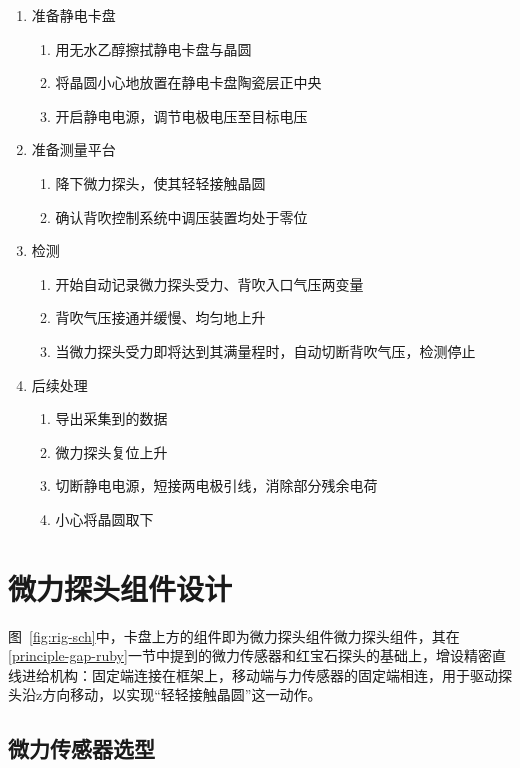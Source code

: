 \begin{enumerate}
  \item 准备静电卡盘
  \begin{enumerate}
    \item 用无水乙醇擦拭静电卡盘与晶圆
    \item 将晶圆小心地放置在静电卡盘陶瓷层正中央
    \item 开启静电电源，调节电极电压至目标电压
  \end{enumerate}
  
  \item 准备测量平台
  \begin{enumerate}
    \item 降下微力探头，使其轻轻接触晶圆
    \item 确认背吹控制系统中调压装置均处于零位
  \end{enumerate}
  
  \item 检测
  \begin{enumerate}
    \item 开始自动记录微力探头受力、背吹入口气压两变量
    \item 背吹气压接通并缓慢、均匀地上升
    \item 当微力探头受力即将达到其满量程时，自动切断背吹气压，检测停止
  \end{enumerate}
  
  \item 后续处理
  \begin{enumerate}
    \item 导出采集到的数据
    \item 微力探头复位上升
    \item 切断静电电源，短接两电极引线，消除部分残余电荷
    \item 小心将晶圆取下
  \end{enumerate}
\end{enumerate}



\section{微力探头组件设计}\label{sec:rig-probe}

图~\ref{fig:rig-sch}中，卡盘上方的组件即为微力探头组件微力探头组件，其在\ref{principle-gap-ruby}一节中提到的微力传感器和红宝石探头的基础上，增设精密直线进给机构：固定端连接在框架上，移动端与力传感器的固定端相连，用于驱动探头沿z方向移动，以实现“轻轻接触晶圆”这一动作。


\subsection{微力传感器选型}

